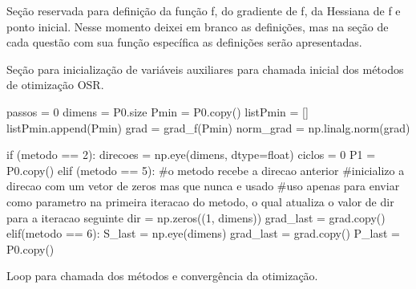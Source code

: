 \documentclass[10pt, a4paper]{article}
\begin{document}
Seção reservada para definição da função f, do gradiente de f, da Hessiana de f e ponto inicial. Nesse momento deixei em branco as definições, mas na seção de cada 
questão com sua função específica as definições serão apresentadas.




Seção para inicialização de variáveis auxiliares para chamada inicial dos métodos de otimização OSR.

\begin{python}
  passos = 0
  dimens = P0.size
  Pmin = P0.copy()
  listPmin = []
  listPmin.append(Pmin)
  grad = grad_f(Pmin)
  norm_grad = np.linalg.norm(grad)

  if (metodo == 2):
      direcoes = np.eye(dimens, dtype=float)
      ciclos = 0
      P1 = P0.copy()
  elif (metodo == 5):
      #o metodo recebe a direcao anterior 
      #inicializo a direcao com um vetor de zeros mas que nunca e usado
      #uso apenas para enviar como parametro na primeira iteracao do metodo, o qual atualiza o valor de dir para a iteracao seguinte
      dir = np.zeros((1, dimens))
      grad_last = grad.copy()
  elif(metodo == 6):
      S_last = np.eye(dimens)
      grad_last = grad.copy()
      P_last = P0.copy()
\end{python}

Loop para chamada dos métodos e convergência da otimização.
\end{document}
